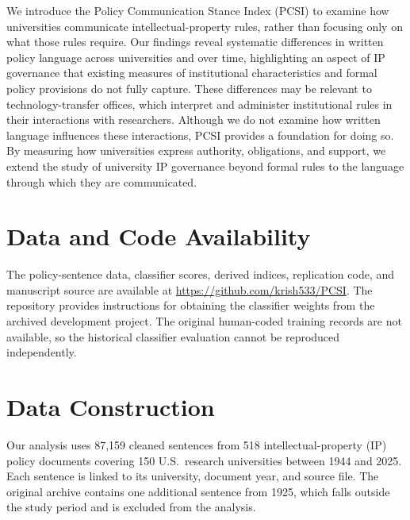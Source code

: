 \documentclass[11pt]{article}
\begin{document}
We introduce the Policy Communication Stance Index (PCSI) to examine how universities communicate intellectual-property rules, rather than focusing only on what those rules require. Our findings reveal systematic differences in written policy language across universities and over time, highlighting an aspect of IP governance that existing measures of institutional characteristics and formal policy provisions do not fully capture. These differences may be relevant to technology-transfer offices, which interpret and administer institutional rules in their interactions with researchers. Although we do not examine how written language influences these interactions, PCSI provides a foundation for doing so. By measuring how universities express authority, obligations, and support, we extend the study of university IP governance beyond formal rules to the language through which they are communicated.


\section*{Data and Code Availability}

The policy-sentence data, classifier scores, derived indices, replication code, and manuscript source are available at \url{https://github.com/krish533/PCSI}. The repository provides instructions for obtaining the classifier weights from the archived development project. The original human-coded training records are not available, so the historical classifier evaluation cannot be reproduced independently.

\singlespacing



\newpage
\appendix
\onehalfspacing
\renewcommand{\thetable}{\thesection\arabic{table}}
\renewcommand{\thefigure}{\thesection\arabic{figure}}

\section{Data Construction}\label{app:data}
\setcounter{table}{0}

Our analysis uses 87,159 cleaned sentences from 518 intellectual-property (IP) policy documents covering 150 U.S.\ research universities between 1944 and 2025. Each sentence is linked to its university, document year, and source file. The original archive contains one additional sentence from 1925, which falls outside the study period and is excluded from the analysis.
\end{document}
